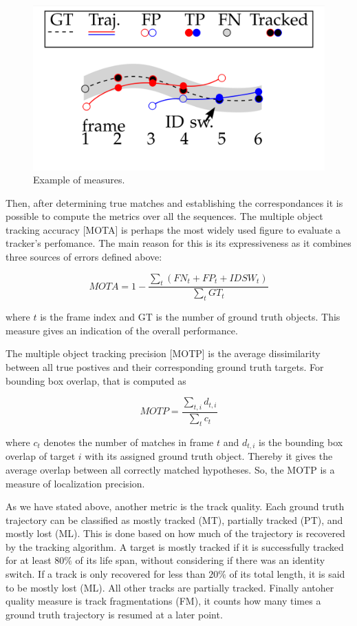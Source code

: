\begin{figure}[H]
\centering         
\includegraphics[width=0.7\linewidth]{datasetTracking/trackins.png}
\caption{Example of measures.} \label{petsExample}
\end{figure}

Then, after determining true matches and establishing the correspondances it is possible to compute the metrics over all the sequences. The multiple object tracking accuracy [MOTA] \cite{clear} is perhaps the most widely used figure to evaluate a tracker's perfomance. The main reason for this is its expressiveness as it combines three sources of errors defined above:

$$ MOTA = 1 - \frac{\sum_{t} (FN_{t}+FP_{t}+IDSW_{t})}{ \sum_{t} GT_{t}}$$

where $t$ is the frame index and GT is the number of ground truth objects. This measure gives an indication of the overall performance.

The multiple object tracking precision [MOTP] is the average dissimilarity between all true postives and their corresponding ground truth targets. For bounding box overlap, that is computed as 

$$ MOTP =  \frac{\sum _{t,i} d_{t,i}}{ \sum_{t} c_{t}} $$

where $c_{t}$ denotes the number of matches in frame $t$ and $d_{t,i}$ is the bounding box overlap of target $i$ with its assigned ground truth object. Thereby it gives the average overlap between all correctly matched hypotheses. So, the MOTP is a measure of localization precision.


As we have stated above, another metric is the track quality. Each ground truth trajectory can be classified as mostly tracked (MT), partially tracked (PT), and mostly lost (ML). This is done based on how much of the trajectory is recovered by the tracking algorithm. A target is mostly tracked if it is successfully tracked for at least $80 \%$ of its life span, without considering if there was an identity switch. If a track is only recovered for less than $20 \%$ of its total length, it is said to be mostly lost (ML). All other tracks are partially tracked. Finally antoher quality measure is track fragmentations (FM), it counts how many times a ground truth trajectory is resumed at a later point.


